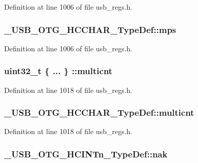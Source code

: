 Definition at line 1006 of file usb\-\_\-regs.\-h.

\hypertarget{group___u_s_b___o_t_g___d_r_i_v_e_r_ga5b4ec8eb01d4007623b8fc18806013d3}{
\subsubsection[{mps}]{ \-\_\-\-U\-S\-B\-\_\-\-O\-T\-G\-\_\-\-H\-C\-C\-H\-A\-R\-\_\-\-Type\-Def\-::mps}}\label{group___u_s_b___o_t_g___d_r_i_v_e_r_ga5b4ec8eb01d4007623b8fc18806013d3}


Definition at line 1006 of file usb\-\_\-regs.\-h.

\hypertarget{group___u_s_b___o_t_g___d_r_i_v_e_r_gaa72cefc31e17271f1ce33e74b53a5414}{
\subsubsection[{multicnt}]{\setlength{\rightskip}{0pt plus 5cm}uint32\-\_\-t \{ ... \} \-::multicnt}}\label{group___u_s_b___o_t_g___d_r_i_v_e_r_gaa72cefc31e17271f1ce33e74b53a5414}


Definition at line 1018 of file usb\-\_\-regs.\-h.

\hypertarget{group___u_s_b___o_t_g___d_r_i_v_e_r_ga26e4da68bd807a1a39feacaa0bdb550a}{
\subsubsection[{multicnt}]{ \-\_\-\-U\-S\-B\-\_\-\-O\-T\-G\-\_\-\-H\-C\-C\-H\-A\-R\-\_\-\-Type\-Def\-::multicnt}}\label{group___u_s_b___o_t_g___d_r_i_v_e_r_ga26e4da68bd807a1a39feacaa0bdb550a}


Definition at line 1018 of file usb\-\_\-regs.\-h.

\hypertarget{group___u_s_b___o_t_g___d_r_i_v_e_r_ga8d865899ab0f1404c53c7ce94dc84aea}{
\subsubsection[{nak}]{ \-\_\-\-U\-S\-B\-\_\-\-O\-T\-G\-\_\-\-H\-C\-I\-N\-Tn\-\_\-\-Type\-Def\-::nak}}\label{group___u_s_b___o_t_g___d_r_i_v_e_r_ga8d865899ab0f1404c53c7ce94dc84aea}


